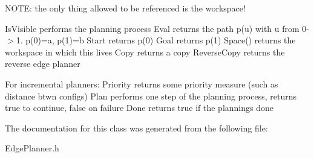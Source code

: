 N\+O\+TE\+: the only thing allowed to be referenced is the workspace!

Is\+Visible performs the planning process Eval returns the path p(u) with u from 0-\/$>$1. p(0)=a, p(1)=b Start returns p(0) Goal returns p(1) Space() returns the workspace in which this lives Copy returns a copy Reverse\+Copy returns the reverse edge planner

For incremental planners\+: Priority returns some priority measure (such as distance btwn configs) Plan performs one step of the planning process, returns true to continue, false on failure Done returns true if the planning\textquotesingle{}s done 

The documentation for this class was generated from the following file\+:\begin{DoxyCompactItemize}
\item 
Edge\+Planner.\+h\end{DoxyCompactItemize}
